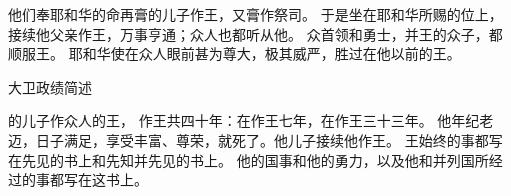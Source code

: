 {\par }{\PP {}他们奉耶和华的命再膏{}的儿子{}作王，又膏{}作祭司。
于是{}坐在耶和华所赐的位上，接续他父亲{}作王，万事亨通；{}众人也都听从他。
众首领和勇士，并{}王的众子，都顺服{}王。
耶和华使{}在{}众人眼前甚为尊大，极其威严，胜过在他以前的{}王。
\par }{\SH 大卫政绩简述
\par }{\PP {}的儿子{}作{}众人的王，
作王共四十年：在{}作王七年，在{}作王三十三年。
他年纪老迈，日子满足，享受丰富、尊荣，就死了。他儿子{}接续他作王。
王始终的事都写在先见{}的书上和先知{}并先见{}的书上。
他的国事和他的勇力，以及他和{}并列国所经过的事都写在这书上。
\par }